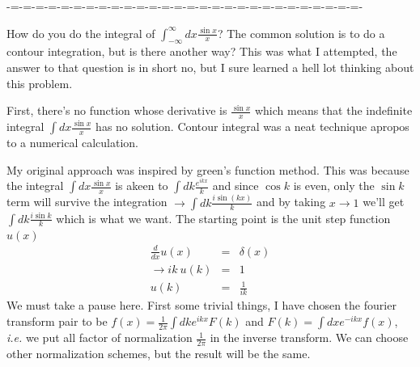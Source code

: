 \documentclass[aps,preprint,preprintnumbers,nofootinbib,showpacs,prd]{revtex4-1}
\newcommand{\ie}{{\it i.e.} }
\newcommand{\nbea}{\begin{eqnarray*}}
\newcommand{\neea}{\end{eqnarray*}}
\begin{document}
-=-=-=-=-=-=-=-=-=-=-=-=-=-=-=-=-=-=-=-=-=-=-=-=-=-=-=-=-

How do you do the integral of $\int_{-\infty}^{\infty} dx \frac{\sin x}{x}$? The common solution is to do a contour integration, but is there another way? This was what I attempted, the answer to that question is in short no, but I sure learned a hell lot thinking about this problem.

First, there's no function whose derivative is $\frac{\sin x}{x}$ which means that the indefinite integral $\int dx \frac{\sin x}{x}$ has no solution. Contour integral was a neat technique apropos to a numerical calculation.

My original approach was inspired by green's function method. This was because the integral $\int dx \frac{\sin x}{x}$ is akeen to $\int dk \frac {e^{ikx}}{k}$ and since $\cos k$ is even, only the $\sin k$ term will survive the integration $\rightarrow \int dk \frac {i\sin (kx)}{k}$ and by taking $x \rightarrow 1$ we'll get $\int dk \frac{i \sin k}{k}$ which is what we want. The starting point is the unit step function $u(x)$
%
\nbea
\frac{d}{dx} u(x) & = & \delta(x) \\
\rightarrow ik ~ u(k) & = & 1 \\
u(k) & = & \frac{1}{ik}
\neea
%
We must take a pause here. First some trivial things, I have chosen the fourier transform pair to be $f(x) = \frac{1}{2\pi} \int dk e^{ikx} F(k)$ and $F(k) = \int dx e^{-ikx} f(x)$, \ie we put all factor of normalization $\frac{1}{2\pi}$ in the inverse transform. We can choose other normalization schemes, but the result will be the same.
\end{document}
